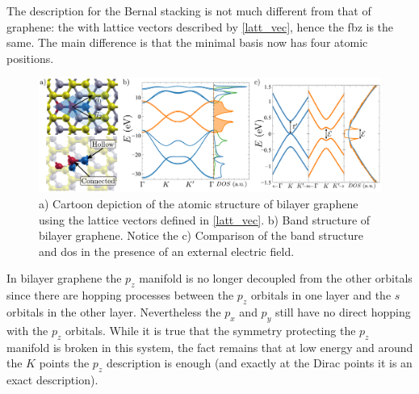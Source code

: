 The description for the Bernal stacking is not much different from that of graphene: the  with lattice vectors described by \eqref{latt_vec}, hence the \ac{fbz} is the same. The main difference is that the minimal basis now has four atomic positions.
\begin{figure}[h!]
\centering
\includegraphics{graphene_bilayer/figures/graphene_bi_summary.pdf}
\vspace{-5pt}
\caption{a) Cartoon depiction of the atomic structure of bilayer graphene using the lattice vectors defined in \eqref{latt_vec}. b) Band structure of bilayer graphene. Notice the c) Comparison of the band structure and \ac{dos} in the presence of an external electric field.}
\label{Gbi_summary}
\end{figure}
\FloatBarrier
In bilayer graphene the $p_z$ manifold is no longer decoupled from the other orbitals since there are hopping processes between the $p_z$ orbitals in one layer and the $s$ orbitals in the other layer. Nevertheless the $p_x$ and $p_y$ still have no direct hopping with the $p_z$ orbitals.
While it is true that the symmetry protecting the $p_z$ manifold is broken in this system, the fact remains that at low energy and around the $K$ points the $p_z$ description is enough (and exactly at the Dirac points it is an exact description).\\

%
%


